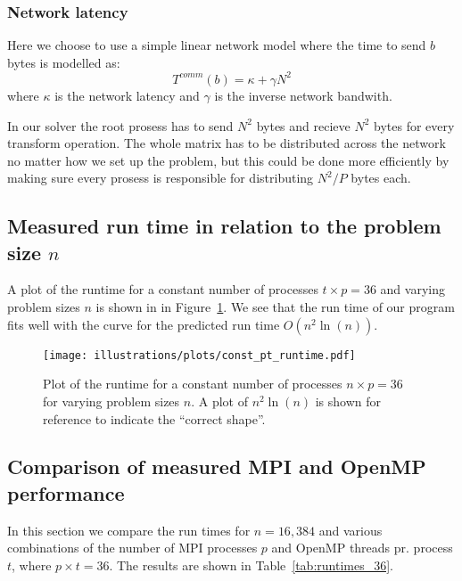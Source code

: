 \subsubsection{Network latency} %
\label{ssub:network_latency}

Here we choose to use a simple linear network model where the time to send $b$ bytes is modelled as:
\begin{equation}
  T^{comm}(b) = \kappa + \gamma N^2
\end{equation}
where $\kappa$ is the network latency and $\gamma$ is the inverse network bandwith.

In our solver the root prosess has to send $N^2$ bytes and recieve $N^2$ bytes for every transform operation. The whole matrix has to be distributed across the network no matter how we set up the problem, but this could be done more efficiently by making sure every prosess is responsible for distributing $N^2/P$ bytes each.





\subsection{Measured run time in relation to the problem size $n$} %
\label{sub:run_time_in_relation_to_the_problem_size_n_}

A plot of the runtime for a constant number of processes $t\times p = 36$ and varying problem sizes $n$ is shown in in Figure~\ref{fig:runtime_const_pt}. We see that the run time of our program fits well with the curve for the predicted run time $O(n^2 \ln(n))$.

\begin{figure}[htbp]
  \centering
  \texttt{[image: illustrations/plots/const\_pt\_runtime.pdf]}
  \caption{Plot of the runtime for a constant number of processes $n\times p = 36$ for varying problem sizes $n$. A plot of $n^2 \ln(n)$ is shown for reference to indicate the ``correct shape''.}
  \label{fig:runtime_const_pt}
\end{figure}


\subsection{Comparison of measured MPI and OpenMP performance} %
\label{sub:comparison_of_mpi_and_openmp_performance}
In this section we compare the run times for $n=16,384$ and various combinations of the number of MPI processes $p$ and OpenMP threads pr. process $t$, where $p\times t = 36$. The results are shown in Table~\ref{tab:runtimes_36}.

